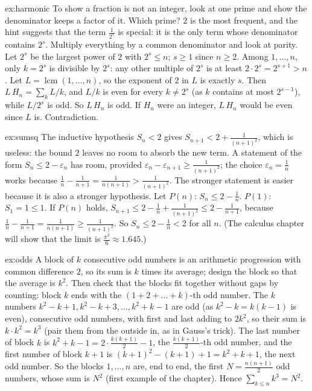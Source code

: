 \begin{solution}{ex:harmonic}
\idea To show a fraction is not an integer, look at one prime and show the denominator keeps a factor of it. Which prime? $2$ is the most frequent, and the hint suggests that the term $\frac1{2^s}$ is special: it is the only term whose denominator contains $2^s$. Multiply everything by a common denominator and look at parity.
\writeup Let $2^s$ be the largest power of $2$ with $2^s\le n$; $s\ge1$ since $n\ge2$. Among $1,\dots,n$, only $k=2^s$
is divisible by $2^s$: any other multiple of $2^s$ is at least $2\cdot2^s=2^{s+1}>n$. Let $L=\operatorname{lcm}(1,\dots,n)$,
so the exponent of $2$ in $L$ is exactly $s$. Then $L\,H_n=\sum_k L/k$, and $L/k$ is even for every $k\ne2^s$ (as $k$ contains at most $2^{s-1}$), while $L/2^s$ is odd.
So $L\,H_n$ is odd. If $H_n$ were an integer, $L\,H_n$ would be even since $L$ is. Contradiction.
\end{solution}

\begin{solution}{ex:sumsq}
\idea The inductive hypothesis $S_n<2$ gives $S_{n+1}<2+\frac1{(n+1)^2}$, which is useless: the bound $2$ leaves no room to absorb the new term. A statement of the form $S_n\le2-\varepsilon_n$ has room, provided $\varepsilon_n-\varepsilon_{n+1}\ge\frac1{(n+1)^2}$; the choice $\varepsilon_n=\frac1n$ works because $\frac1n-\frac1{n+1}=\frac1{n(n+1)}>\frac1{(n+1)^2}$. The stronger statement is easier because it is also a stronger hypothesis.
\writeup Let $P(n)$: $S_n\le2-\frac1n$. $P(1)$: $S_1=1\le1$. If $P(n)$ holds, $S_{n+1}\le2-\frac1n+\frac1{(n+1)^2}\le2-\frac1{n+1}$, because
$\frac1n-\frac1{n+1}=\frac1{n(n+1)}\ge\frac1{(n+1)^2}$. So $S_n\le2-\frac1n<2$ for all $n$. (The calculus chapter will show that the limit is $\frac{\pi^2}6\approx1.645$.)
\end{solution}

\begin{solution}{ex:odds}
\idea A block of $k$ consecutive odd numbers is an arithmetic progression with common difference $2$, so its sum is $k$ times its average; design the block so that the average is $k^2$. Then check that the blocks fit together without gaps by counting: block $k$ ends with the $(1+2+\dots+k)$-th odd number.
\writeup The $k$ numbers $k^2-k+1,k^2-k+3,\dots,k^2+k-1$ are odd (as $k^2-k=k(k-1)$ is even), consecutive odd numbers, with first and last adding to $2k^2$, so their sum is $k\cdot k^2=k^3$ (pair them from the outside in, as in Gauss's trick). The last number of block $k$ is $k^2+k-1=2\cdot\frac{k(k+1)}2-1$, the $\frac{k(k+1)}2$-th odd number, and the first number of block $k+1$ is $(k+1)^2-(k+1)+1=k^2+k+1$, the next odd number. So the blocks $1,\dots,n$ are, end to end, the first $N=\frac{n(n+1)}2$ odd numbers, whose sum is $N^2$ (first example of the chapter). Hence $\sum_{k\le n}k^3=N^2$.
\end{solution}

